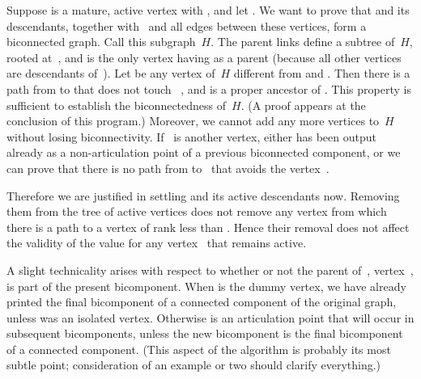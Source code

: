 Suppose  is a mature, active vertex with , and
let . We want to prove that  and its
descendants,
together with~ and all edges between these vertices, form a
biconnected graph.  Call this subgraph~$H$. The parent links
define a subtree of~$H$, rooted at~, and  is the only vertex
having  as a parent (because all other vertices are descendants
of~). Let  be any vertex of~$H$ different from  and %
.
Then there is a path from  to  that does not touch~%
,
and  is a proper ancestor of . This
property
is sufficient to establish the biconnectedness of~$H$. (A proof appears
at the conclusion of this program.) Moreover, we cannot add any
more vertices to~$H$ without losing biconnectivity. If ~is another
vertex, either  has been output already as a non-articulation point
of a previous biconnected component, or we can prove that
there is no path from  to~ that avoids the vertex~.

\fi

Therefore we are justified in settling  and its active
descendants now.
Removing them from the tree of active vertices does not remove any
vertex from which there is a path to a vertex of rank less than .
Hence their removal does not affect the validity of the 
value
for any vertex~ that remains active.

A slight technicality arises with respect to whether or not
the parent of~, vertex~, is part of the present bicomponent.
When  is the dummy vertex, we have already printed the final
bicomponent
of a connected component of the original graph, unless  was
an isolated vertex. Otherwise  is an
articulation point that will occur in subsequent bicomponents,
unless the new bicomponent is the final bicomponent of a connected component.
(This aspect of the algorithm is probably its most subtle point;
consideration of an example or two should clarify everything.)

